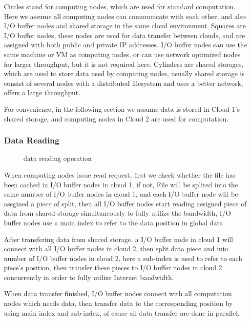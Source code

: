 \documentclass[JIP,draft]{ipsj}
\begin{document}
Circles stand for computing nodes, which are used for standard computation.
Here we assume all computing nodes can communicate with each other, and also I/O buffer nodes and shared storage in the same cloud environment.
Squares are I/O buffer nodes, these nodes are used for data transfer between clouds, and are assigned with both public and private IP addresses.
I/O buffer nodes can use the same machine or VM as computing nodes, or can use network optimized nodes for larger throughput, but it is not required here.
Cylinders are shared storages, which are used to store data used by computing nodes, usually shared storage is consist of several nodes with a distributed filesystem and uses a better network, offers a large throughput.


For convenience, in the following section we assume data is stored in Cloud 1's shared storage, and computing nodes in Cloud 2 are used for computation. 

\subsubsection{Data Reading}

\begin{figure}[tb]
	\centering
	\caption{data reading operation}
	\label{reading}
\end{figure}

When computing nodes issue read request, first we check whether the file has been cached in I/O buffer nodes in cloud 1, if not, File will be splited into the same number of I/O buffer nodes in cloud 1, and each I/O buffer node will be assgined a piece of split, then all I/O buffer nodes start reading assigned piece of data from shared storage simultaneously to fully utilize the bandwidth, I/O buffer nodes use a main index to refer to the data position in global data.

After transfering data from shared storage, a I/O buffer node in cloud 1 will connect with all I/O buffer nodes in cloud 2, then split data piece and into number of I/O buffer nodes in cloud 2, here a sub-index is used to refer to each piece's position, then transfer these pieces to I/O buffer nodes in cloud 2 concurrently in order to fully utilize Internet bandwidth.

When data transfer finished, I/O buffer nodes connect with all computation nodes which needs data, then transfer data to the corresponding position by using main index and sub-index, of cause all data transfer are done in parallel.
\end{document}
